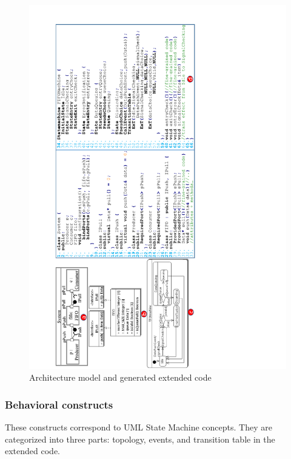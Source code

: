   

\begin{figure}
	\centering
	\includegraphics[angle=-90,clip, trim=2cm 0cm 7.0cm 1cm, width=\textwidth]{figures/approachexample3.pdf}
	\caption{Architecture model and generated extended code} 
	\label{fig:approachexample}
\end{figure}


\subsubsection{Behavioral constructs}
These constructs correspond to UML State Machine concepts. They are categorized into three parts: topology, events, and transition table in the extended code.


